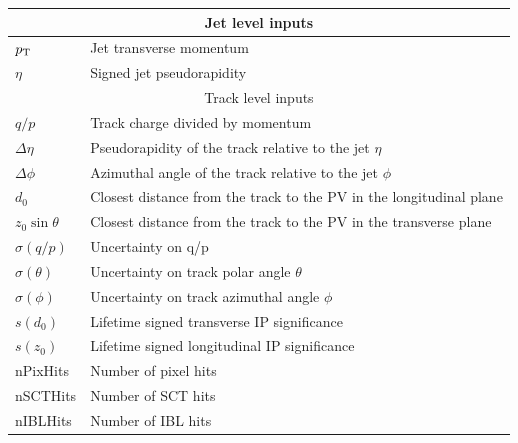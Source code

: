 \begin{table}[h]
    \centering
    \begin{tabular}{ll}
        \toprule
        \midrule
        \multicolumn{2}{c}{Jet level inputs}                                                    \\
        \midrule
        $p_\mathrm{T}$             & Jet transverse momentum                                             \\
        $\eta$            & Signed jet pseudorapidity                                           \\
        \midrule
        \midrule
        \multicolumn{2}{c}{Track level inputs}                                                  \\
        \midrule
        $q/p$             & Track charge divided by momentum                                    \\
        $\Delta\eta$      & Pseudorapidity of the track relative to the jet $\eta$              \\
        $\Delta\phi$      & Azimuthal angle of the track relative to the jet $\phi$             \\
        $d_0$             & Closest distance from the track to the PV in the longitudinal plane \\
        $z_0 \sin \theta$ & Closest distance from the track to the PV in the transverse plane   \\
        $\sigma(q/p)$     & Uncertainty on q/p                                                  \\
        $\sigma(\theta)$  & Uncertainty on track polar angle $\theta$                           \\
        $\sigma(\phi)$    & Uncertainty on track azimuthal angle $\phi$                         \\
        $s(d_0)$          & Lifetime signed transverse IP significance                          \\
        $s(z_0)$          & Lifetime signed longitudinal IP significance                        \\
        nPixHits          & Number of pixel hits                                                \\
        nSCTHits          & Number of SCT hits                                                  \\
        nIBLHits          & Number of IBL hits                                                  \\

\end{tabular}
\end{table}
